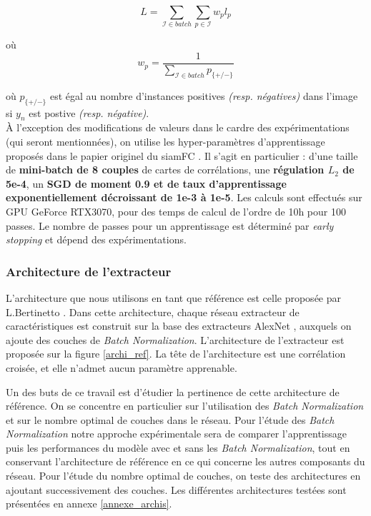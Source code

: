 \documentclass[10pt,twocolumn,letterpaper,french]{article}
\newcommand\norm[1]{\left\lVert#1\right\rVert}
\begin{document}
$$L = \sum_{\mathcal{I} \in batch} \sum_{p \in \mathcal{I}} w_{p}l_p$$

où $$w_{p} = \frac{1}{\sum_{\mathcal{I} \in batch}p_{\{+/-\}}} $$


où $p_{\{+/-\}}$ est égal au nombre d'instances positives \textit{(resp. négatives)} dans l'image si $y_{n}$ est postive \textit{(resp. négative)}. \\

À l'exception des modifications de valeurs dans le cardre des expérimentations (qui seront mentionnées), on utilise les hyper-paramètres d'apprentissage proposés dans le papier originel du siamFC \cite{siamfc}. Il s'agit en particulier : d'une taille de \textbf{mini-batch de 8 couples} de cartes de corrélations, une \textbf{régulation $L_2$ de 5e-4}, un \textbf{SGD de moment 0.9 et de taux d'apprentissage exponentiellement décroissant de 1e-3 à 1e-5}. Les calculs sont effectués sur GPU GeForce RTX3070, pour des temps de calcul de l'ordre de 10h pour 100 passes. Le nombre de passes pour un apprentissage est déterminé par \textit{early stopping} et dépend des expérimentations.


\subsubsection*{Architecture de l'extracteur}

L'architecture que nous utilisons en tant que référence est celle proposée par L.Bertinetto \cite{siamfc}. Dans cette architecture, chaque réseau extracteur de caractéristiques est construit sur la base des extracteurs AlexNet \cite{alexnet}, auxquels on ajoute des couches de \textit{Batch Normalization}. L'architecture de l'extracteur est proposée sur la figure \ref{archi_ref}. La tête de l'architecture est une corrélation croisée, et elle n'admet aucun paramètre apprenable.

Un des buts de ce travail est d'étudier la pertinence de cette architecture de référence. On se concentre en particulier sur l'utilisation des \textit{Batch Normalization} et sur le nombre optimal de couches dans le réseau. Pour l'étude des \textit{Batch Normalization} notre approche expérimentale sera de comparer l'apprentissage puis les performances du modèle avec et sans les \textit{Batch Normalization}, tout en conservant l'architecture de référence en ce qui concerne les autres composants du réseau. Pour l'étude du nombre optimal de couches, on teste des architectures en ajoutant successivement des couches. Les différentes architectures testées sont présentées en annexe \ref{annexe_archis}.
\end{document}
